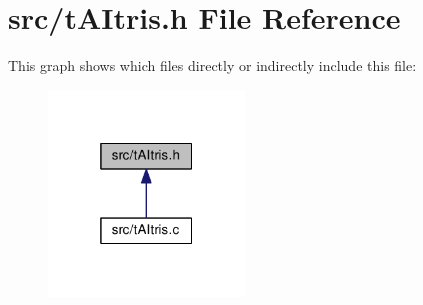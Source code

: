 \section{src/t\+A\+Itris.h File Reference}
\label{tAItris_8h}
This graph shows which files directly or indirectly include this file\+:\nopagebreak
\begin{figure}[H]
\begin{center}
\leavevmode
\includegraphics[width=148pt]{tAItris_8h__dep__incl}
\end{center}
\end{figure}
